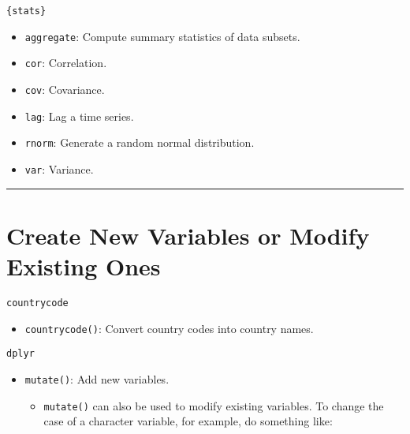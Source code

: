 \documentclass[
]{book}
\newenvironment{Shaded}{\begin{snugshade}}{\end{snugshade}}
\newcommand{\DataTypeTok}[1]{\textcolor[rgb]{0.13,0.29,0.53}{#1}}
\newcommand{\KeywordTok}[1]{\textcolor[rgb]{0.13,0.29,0.53}{\textbf{#1}}}
\newcommand{\NormalTok}[1]{#1}
\newcommand{\OperatorTok}[1]{\textcolor[rgb]{0.81,0.36,0.00}{\textbf{#1}}}
\newcommand{\StringTok}[1]{\textcolor[rgb]{0.31,0.60,0.02}{#1}}
\providecommand{\tightlist}{%
  \setlength{\itemsep}{0pt}\setlength{\parskip}{0pt}}
\begin{document}
\texttt{\{stats\}}

\begin{itemize}
\tightlist
\item
  \texttt{aggregate}: Compute summary statistics of data subsets.
\item
  \texttt{cor}: Correlation.
\item
  \texttt{cov}: Covariance.
\item
  \texttt{lag}: Lag a time series.
\item
  \texttt{rnorm}: Generate a random normal distribution.
\item
  \texttt{var}: Variance.
\end{itemize}

\begin{center}\rule{0.5\linewidth}{0.5pt}\end{center}

\hypertarget{create-new-variables-or-modify-existing-ones}{%
\section{Create New Variables or Modify Existing Ones}\label{create-new-variables-or-modify-existing-ones}}

\texttt{countrycode}

\begin{itemize}
\tightlist
\item
  \texttt{countrycode()}: Convert country codes into country names.
\end{itemize}

\texttt{dplyr}

\begin{itemize}
\tightlist
\item
  \texttt{mutate()}: Add new variables.

  \begin{itemize}
  \tightlist
  \item
    \texttt{mutate()} can also be used to modify existing variables. To change the case of a character variable, for example, do something like:
  \end{itemize}
\end{itemize}

\begin{Shaded}
\end{Shaded}
\end{document}
